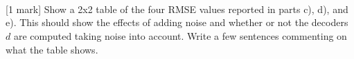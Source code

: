 \documentclass{article}
\begin{document}
    \begin{center}
    \end{center}
    { \hspace*{\fill} \\}
    
    \begin{center}
    \end{center}
    { \hspace*{\fill} \\}
    
    \begin{center}
    \end{center}
    { \hspace*{\fill} \\}
    
    {[}1 mark{]} Show a 2x2 table of the four RMSE values reported in parts
c), d), and e). This should show the effects of adding noise and whether
or not the decoders $d$ are computed taking noise into account. Write a
few sentences commenting on what the table shows.
\end{document}
